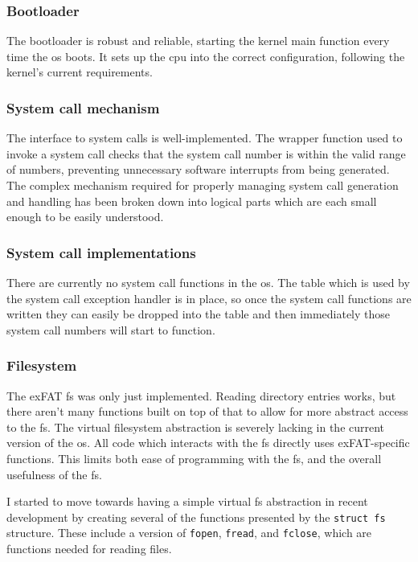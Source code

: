 \documentclass{article}
\begin{document}
\subsubsection{Bootloader}
The bootloader is robust and reliable, starting the kernel main function every
time the \gls{os} boots. It sets up the \gls{cpu} into the correct
configuration, following the kernel's current requirements.

\subsubsection{System call mechanism}
The interface to system calls is well-implemented. The wrapper function used to
invoke a system call checks that the system call number is within the valid
range of numbers, preventing unnecessary software interrupts from being
generated. The complex mechanism required for properly managing system call
generation and handling has been broken down into logical parts which are each
small enough to be easily understood.

\subsubsection{System call implementations}
\label{sec:eval_no_syscalls}
There are currently no system call functions in the \gls{os}. The table which
is used by the system call exception handler is in place, so once the system
call functions are written they can easily be dropped into the table and then
immediately those system call numbers will start to function.

\subsubsection{Filesystem}
The exFAT \gls{fs} was only just implemented. Reading directory entries works,
but there aren't many functions built on top of that to allow for more abstract
access to the \gls{fs}. The virtual filesystem abstraction is severely lacking
in the current version of the \gls{os}. All code which interacts with the
\gls{fs} directly uses exFAT-specific functions. This limits both ease of
programming with the \gls{fs}, and the overall usefulness of the \gls{fs}.

I started to move towards having a simple virtual \gls{fs} abstraction in
recent development by creating several of the functions presented by the
\verb!struct fs! structure. These include a version of \texttt{fopen},
\texttt{fread}, and \texttt{fclose}, which are functions needed for reading
files.
\end{document}
